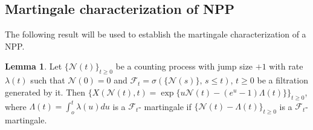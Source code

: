 \documentclass[11pt,oneside,reqno]{amsart}
\theoremstyle{definition}
\newtheorem{lemma}{Lemma}[section]
\theoremstyle{remarkstyle}
\begin{document}
\subsection{Martingale characterization of NPP}
The following result will be used to establish the martingale characterization of a NPP. 
\begin{lemma}\label{martingale lemma}
  Let $\{\mathcal{N}(t)\}_{t\ge 0}$ be a counting process with jump size $+1$ with rate $\lambda(t)$ such that $\mathcal{N}(0)=0$ and $\mathcal{F}_t=\sigma(\{\mathcal{N}(s)\},\,s\le t)$, $t\ge 0$ be a filtration generated by it. Then $\{X(\mathcal{N}(t),t)=\exp\{u\mathcal{N}(t)-(e^u-1)\Lambda(t)\}\}_{t\ge 0}$, where $\Lambda(t)=\int_{o}^{t}\lambda(u)du$ is a $\mathcal{F}_t$- martingale if $\{\mathcal{N}(t)-\Lambda(t)\}_{t\ge 0}$ is a $\mathcal{F}_t$-martingale.  
\end{lemma}
\end{document}
